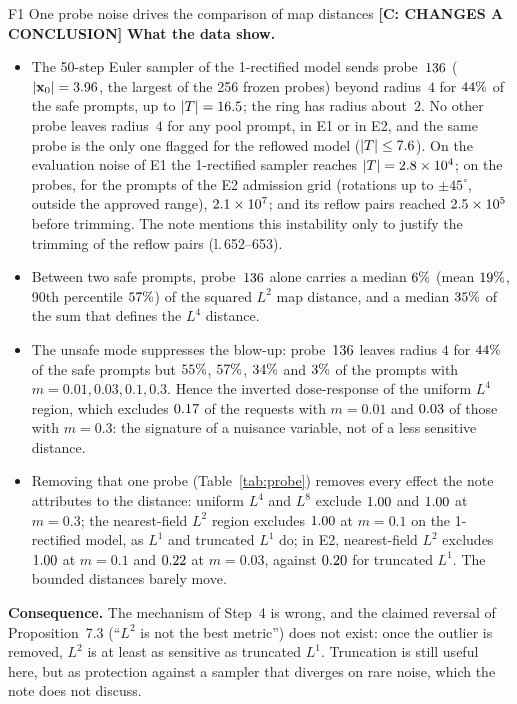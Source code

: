 \documentclass[11pt]{article}
\newcommand{\bx}{\mathbf{x}}
\newcommand{\lin}[1]{l.\,#1}
\newcommand{\badge}[2]{\textcolor{#1}{\textbf{[#2]}}}
\newcommand{\Sconc}{\badge{errRed}{C: CHANGES A CONCLUSION}}
\begin{document}
\begin{findbox}{F1 \quad One probe noise drives the comparison of map distances \hfill \Sconc}
\smallskip\textbf{What the data show.}
\begin{itemize}[leftmargin=1.3em,itemsep=1pt,topsep=2pt]
\item The 50-step Euler sampler of the 1-rectified model sends probe~$136$ ($|\bx_0|=\auProbeNorm$, the largest of the
256 frozen probes) beyond radius~$4$ for $44\%$ of the safe prompts, up to $|T|=16.5$; the ring has radius
about~$2$. No other probe leaves radius~$4$ for any pool prompt, in E1 or in E2, and the same probe is the only one flagged for
the reflowed model ($|T|\le7.6$). On the evaluation noise of E1 the 1-rectified sampler reaches $|T|=2.8\times10^{4}$; on the
probes, for the prompts of the E2 admission grid (rotations up to $\pm45^\circ$, outside the approved range), $2.1\times10^{7}$; and its
reflow pairs reached $2.5\times10^{5}$ before trimming. The note mentions this
instability only to justify the trimming of the reflow pairs (\lin{652--653}).
\item Between two safe prompts, probe~$136$ alone carries a median $6\%$ (mean $19\%$, 90th percentile
$57\%$) of the squared $L^2$ map distance, and a median $35\%$ of the sum that defines the $L^4$ distance.
\item The unsafe mode suppresses the blow-up: probe~$136$ leaves radius $4$ for $44\%$ of the safe prompts but
$55\%$, $57\%$, $34\%$ and $3\%$ of the prompts with $m=0.01,0.03,0.1,0.3$. Hence the inverted dose-response of the
uniform $L^4$ region, which excludes $0.17$ of the requests with $m=0.01$ and $0.03$ of those with $m=0.3$: the
signature of a nuisance variable, not of a less sensitive distance.
\item Removing that one probe (Table~\ref{tab:probe}) removes every effect the note attributes to the distance: uniform $L^4$ and
$L^8$ exclude $1.00$ and $1.00$ at $m=0.3$; the nearest-field $L^2$ region excludes $1.00$ at $m=0.1$ on the
1-rectified model, as $L^1$ and truncated $L^1$ do; in E2, nearest-field $L^2$ excludes $1.00$ at $m=0.1$ and $0.22$ at
$m=0.03$, against $0.20$ for truncated $L^1$. The bounded distances barely move.
\end{itemize}
\textbf{Consequence.} The mechanism of Step~4 is wrong, and the claimed reversal of Proposition~7.3 (``$L^2$ is not the best
metric'') does not exist: once the outlier is removed, $L^2$ is at least as sensitive as truncated $L^1$. Truncation is still
useful here, but as protection against a sampler that diverges on rare noise, which the note does not discuss.
\end{findbox}
\end{document}
